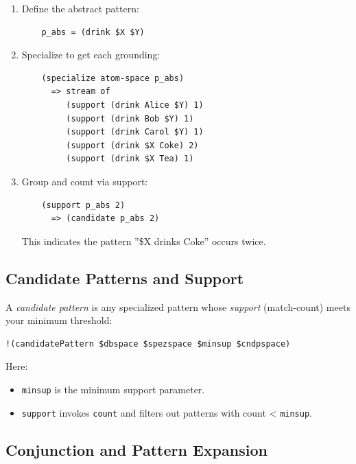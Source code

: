 \documentclass{article}
\begin{document}
\begin{enumerate}

\item  Define the abstract pattern:

    \begin{verbatim}
    p_abs = (drink $X $Y)
    \end{verbatim}

\item  Specialize to get each grounding:

    \begin{verbatim}
    (specialize atom-space p_abs)
      => stream of
         (support (drink Alice $Y) 1)
         (support (drink Bob $Y) 1)
         (support (drink Carol $Y) 1)
         (support (drink $X Coke) 2)
         (support (drink $X Tea) 1)
    \end{verbatim}

\item   Group and count via support:

    \begin{verbatim}
    (support p_abs 2)
      => (candidate p_abs 2)
    \end{verbatim}

    This indicates the pattern ''\$X drinks Coke'' occurs twice.
\end{enumerate}

\subsection{Candidate Patterns and Support}

A \emph{candidate pattern} is any specialized pattern whose \emph{support} (match-count) meets your minimum threshold:

\begin{verbatim}
!(candidatePattern $dbspace $spezspace $minsup $cndpspace)
\end{verbatim}

Here:
\begin{itemize}
  \item \texttt{minsup} is the minimum support parameter.
  \item \texttt{support} invokes \texttt{count} and filters out patterns with count < \texttt{minsup}.
\end{itemize}

\subsection{Conjunction and Pattern Expansion}
\end{document}
